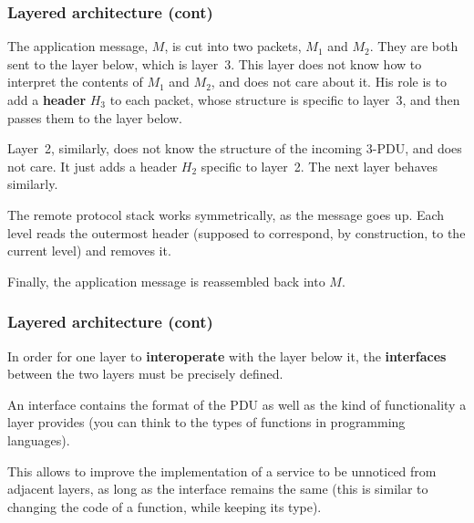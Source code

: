 %
\begin{frame}
\frametitle{Layered architecture (cont)}

The application message, \(M\), is cut into two packets, \(M_1\) and
\(M_2\). They are both sent to the layer below, which is layer~3. This
layer does not know how to interpret the contents of \(M_1\) and
\(M_2\), and does not care about it. His role is to add a
\textbf{header} \(H_3\) to each packet, whose structure is specific to
layer~3, and then passes them to the layer below.

\bigskip

Layer~2, similarly, does not know the structure of the incoming 3-PDU,
and does not care. It just adds a header \(H_2\) specific to layer~2.
The next layer behaves similarly.

\bigskip

The remote protocol stack works symmetrically, as the message goes
up. Each level reads the outermost header (supposed to correspond, by
construction, to the current level) and removes it.

\bigskip

Finally, the application message is reassembled back into \(M\).

\end{frame}

%
\begin{frame}
\frametitle{Layered architecture (cont)}

In order for one layer to \textbf{interoperate} with the layer below
it, the \textbf{interfaces} between the two layers must be precisely
defined. 

\bigskip

An interface contains the format of the PDU as well as the kind of
functionality a layer provides (you can think to the types of
functions in programming languages).

\bigskip

This allows to improve the implementation of a service to be unnoticed
from adjacent layers, as long as the interface remains the same (this
is similar to changing the code of a function, while keeping its
type).

\end{frame}

